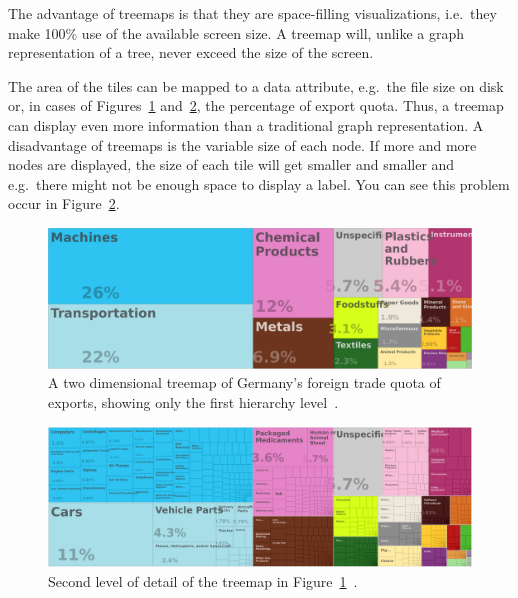 The advantage of treemaps is that they are space-filling visualizations, i.e.\ they make 100\% use of the available screen size.
A treemap will, unlike a graph representation of a tree, never exceed the size of the screen.

The area of the tiles can be mapped to a data attribute, e.g.\ the file size on disk or, in cases of Figures~\ref{fig:related-work:treemap-german-exports-1} and~\ref{fig:related-work:treemap-german-exports-2}, the percentage of export quota.
Thus, a treemap can display even more information than a traditional graph representation.
A disadvantage of treemaps is the variable size of each node.
If more and more nodes are displayed, the size of each tile will get smaller and smaller and e.g.\ there might not be enough space to display a label.
You can see this problem occur in Figure~\ref{fig:related-work:treemap-german-exports-2}.

\begin{figure}
    \centering
    \includegraphics[width=\textwidth]{figures/related-work/en_profile_country_deu_1}
    \caption{A two dimensional treemap of Germany's foreign trade quota of exports, showing only the first hierarchy level~\parencite{Observatory2017}.}
    \label{fig:related-work:treemap-german-exports-1}
\end{figure}

\begin{figure}
    \centering
    \includegraphics[width=\textwidth]{figures/related-work/en_profile_country_deu_2}
    \caption{Second level of detail of the treemap in Figure~\ref{fig:related-work:treemap-german-exports-1}~\parencite{Observatory2017}.}
    \label{fig:related-work:treemap-german-exports-2}
\end{figure}

